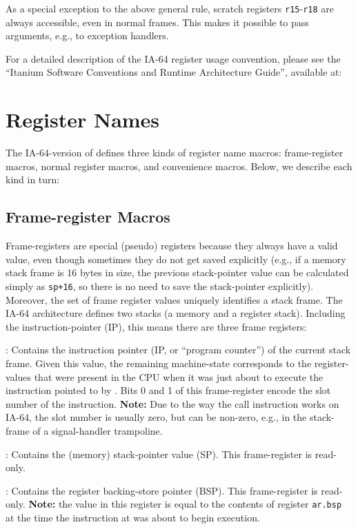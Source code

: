 \documentclass{article}
\begin{document}
As a special exception to the above general rule, scratch registers
\texttt{r15}-\texttt{r18} are always accessible, even in normal
frames.  This makes it possible to pass arguments, e.g., to exception
handlers.

For a detailed description of the IA-64 register usage convention,
please see the ``Itanium Software Conventions and Runtime Architecture
Guide'', available at:
\begin{center}
\end{center}


\section{Register Names}

The IA-64-version of  defines three kinds of register
name macros: frame-register macros, normal register macros, and
convenience macros.  Below, we describe each kind in turn:


\subsection{Frame-register Macros}

Frame-registers are special (pseudo) registers because they always
have a valid value, even though sometimes they do not get saved
explicitly (e.g., if a memory stack frame is 16 bytes in size, the
previous stack-pointer value can be calculated simply as
\texttt{sp+16}, so there is no need to save the stack-pointer
explicitly).  Moreover, the set of frame register values uniquely
identifies a stack frame.  The IA-64 architecture defines two stacks
(a memory and a register stack). Including the instruction-pointer
(IP), this means there are three frame registers:
\begin{Description}
\item[\Const{UNW\_IA64\_IP}:] Contains the instruction pointer (IP, or
  ``program counter'') of the current stack frame.  Given this value,
  the remaining machine-state corresponds to the register-values that
  were present in the CPU when it was just about to execute the
  instruction pointed to by .  Bits 0 and 1 of
  this frame-register encode the slot number of the instruction.
  \textbf{Note:} Due to the way the call instruction works on IA-64,
  the slot number is usually zero, but can be non-zero, e.g., in the
  stack-frame of a signal-handler trampoline.
\item[\Const{UNW\_IA64\_SP}:] Contains the (memory) stack-pointer
  value (SP).  This frame-register is read-only.
\item[\Const{UNW\_IA64\_BSP}:] Contains the register backing-store
  pointer (BSP).  This frame-register is read-only.  \textbf{Note:}
  the value in this register is equal to the contents of register
  \texttt{ar.bsp} at the time the instruction at 
  was about to begin execution.
\end{Description}
\end{document}
